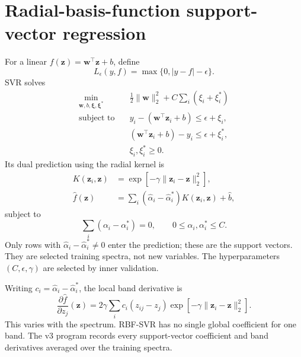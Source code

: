 \documentclass[11pt]{article}
\begin{document}
\section{Radial-basis-function support-vector regression}
For a linear $f(\bm z)=\bm w^\top\bm z+b$, define
\begin{equation}
 L_\epsilon(y,f)=\max\{0,|y-f|-\epsilon\}.
\end{equation}
SVR solves
\begin{equation}
\begin{aligned}
 \min_{\bm w,b,\bm\xi,\bm\xi^*}\quad&
 \frac12\|\bm w\|_2^2+C\sum_i(\xi_i+\xi_i^*)\\
 \text{subject to}\quad&y_i-(\bm w^\top\bm z_i+b)\le\epsilon+\xi_i,\\
 &(\bm w^\top\bm z_i+b)-y_i\le\epsilon+\xi_i^*,\\
 &\xi_i,\xi_i^*\ge0.
\end{aligned}
\end{equation}
Its dual prediction using the radial kernel is
\begin{align}
 K(\bm z_i,\bm z)&=\exp[-\gamma\|\bm z_i-\bm z\|_2^2],\\
 \widehat f(\bm z)&=\sum_i(\widehat\alpha_i-\widehat\alpha_i^*)K(\bm z_i,\bm z)+\widehat b,
\end{align}
subject to
\begin{equation}
 \sum_i(\alpha_i-\alpha_i^*)=0,
 \qquad 0\le\alpha_i,\alpha_i^*\le C.
\end{equation}
Only rows with $\widehat\alpha_i-\widehat\alpha_i^*\ne0$ enter the prediction; these are the support vectors. They are selected training spectra, not new variables. The hyperparameters $(C,\epsilon,\gamma)$ are selected by inner validation.

Writing $c_i=\widehat\alpha_i-\widehat\alpha_i^*$, the local band derivative is
\begin{equation}
 \frac{\partial\widehat f}{\partial z_j}(\bm z)
 =2\gamma\sum_i c_i(z_{ij}-z_j)
 \exp[-\gamma\|\bm z_i-\bm z\|_2^2].
\end{equation}
This varies with the spectrum. RBF-SVR has no single global coefficient for one band. The v3 program records every support-vector coefficient and band derivatives averaged over the training spectra.
\end{document}
